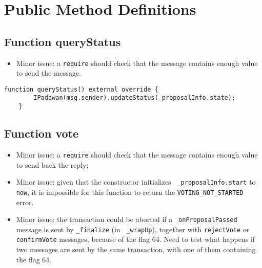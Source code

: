 \section{Public Method Definitions}

\subsection{Function queryStatus}

\begin{itemize}
\item Minor issue: a {\tt require} should check that the message
  contains enough value to send the message.
\end{itemize}

\begin{lstlisting}[firstnumber=162]
    function queryStatus() external override {
        IPadawan(msg.sender).updateStatus(_proposalInfo.state);
    }
\end{lstlisting}

\subsection{Function vote}

\begin{itemize}
\item Minor issue: a {\tt require} should check that the message
  contains enough value to send back the reply;
\item Minor issue: given that the constructor initializes {\tt
  \_proposalInfo.start} to {\tt now}, it is impossible for this
  function to return the {\tt VOTING\_NOT\_STARTED} error.
\item Minor issue: the transaction could be aborted if a {\tt
  onProposalPassed} message is sent by {\tt \_finalize} (in {\tt
  \_wrapUp}), together with {\tt rejectVote} or {\tt confirmVote}
  messages, because of the flag 64.  Need to test what happens if two
  messages are sent by the same transaction, with one of them
  containing the flag 64.
\end{itemize}

